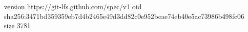 version https://git-lfs.github.com/spec/v1
oid sha256:3471bd359359eb7d4b2465e49d3dd82c0e952beae74eb40e5ac73986b498fc06
size 3781
